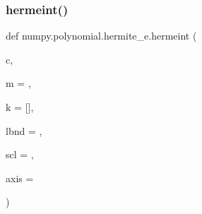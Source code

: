 \subsubsection{\texorpdfstring{hermeint()}{hermeint()}}
{\footnotesize\ttfamily def numpy.\+polynomial.\+hermite\+\_\+e.\+hermeint (\begin{DoxyParamCaption}\item[{}]{c,  }\item[{}]{m = {},  }\item[{}]{k = {\ttfamily \mbox{[}\mbox{]}},  }\item[{}]{lbnd = {},  }\item[{}]{scl = {},  }\item[{}]{axis = {} }\end{DoxyParamCaption})}

